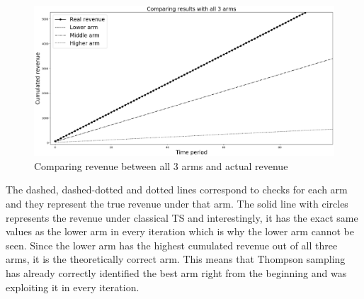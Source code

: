 \documentclass[a4paper]{article}
\begin{document}
\begin{figure}[h]
	\centering
	\includegraphics[width=1\textwidth]{Figure_1-2.png}
	\caption{\label{fig:one}Comparing revenue between all 3 arms and actual revenue}
\end{figure}
\newline
\newline
The dashed, dashed-dotted and dotted lines correspond to checks for each arm and they represent the true revenue under that arm. The solid line with circles represents the revenue under classical TS and interestingly, it has the exact same values as the lower arm in every iteration which is why the lower arm cannot be seen. Since the lower arm has the highest cumulated revenue out of all three arms, it is the theoretically correct arm. This means that Thompson sampling has already correctly identified the best arm right from the beginning and was exploiting it in every iteration.
\end{document}
